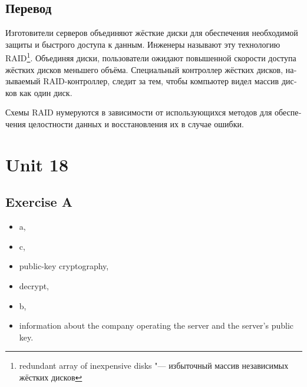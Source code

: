 \documentclass[a5paper,10pt,notitlepage,pdftex,headsepline]{scrartcl}
\begin{document}
  \subsection{Перевод}
    \begin{otherlanguage}{russian}
      Изготовители серверов объединяют жёсткие диски для обеспечения
      необходимой защиты и быстрого доступа к данным.
      Инженеры называют  эту технологию RAID\footnote{redundant array of
      inexpensive disks "--- избыточный массив независимых жёстких дисков}.
      Объединяя диски, пользователи ожидают повышенной скорости доступа
      жёстких дисков меньшего объёма.
      Специальный контроллер жёстких дисков, называемый RAID-контроллер,
      следит за тем, чтобы компьютер видел массив дисков как один диск.

      Схемы RAID нумеруются в зависимости от использующихся методов для
      обеспечения целостности данных и восстановления их в случае ошибки.
    \end{otherlanguage}
\section{Unit 18}
  \subsection{Exercise A}
    \begin{itemize}
      \item a,
      \item c,
      \item public-key cryptography,
      \item decrypt,
      \item b,
      \item information about the company operating the server and the
        server's public key.
    \end{itemize}
\end{document}
